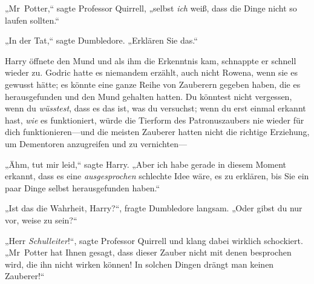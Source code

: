 „Mr~Potter,“ sagte Professor Quirrell, „selbst \emph{ich} weiß, dass die Dinge nicht so laufen sollten.“

„In der Tat,“ sagte Dumbledore. „Erklären Sie das.“

Harry öffnete den Mund und als ihm die Erkenntnis kam, schnappte er schnell wieder zu. Godric hatte es niemandem erzählt, auch nicht Rowena, wenn sie es gewusst hätte; es könnte eine ganze Reihe von Zauberern gegeben haben, die es herausgefunden und den Mund gehalten hatten. Du könntest nicht vergessen, wenn du \emph{wüsstest}, dass es das ist, was du versuchst; wenn du erst einmal erkannt hast, \emph{wie} es funktioniert, würde die Tierform des Patronuszaubers nie wieder für dich funktionieren—und die meisten Zauberer hatten nicht die richtige Erziehung, um Dementoren anzugreifen und zu vernichten—

„Ähm, tut mir leid,“ sagte Harry. „Aber ich habe gerade in diesem Moment erkannt, dass es eine \emph{ausgesprochen} schlechte Idee wäre, es zu erklären, bis Sie ein paar Dinge selbst herausgefunden haben.“

„Ist das die Wahrheit, Harry?“, fragte Dumbledore langsam. „Oder gibst du nur vor, weise zu sein?“

„Herr \emph{Schulleiter}!“, sagte Professor Quirrell und klang dabei wirklich schockiert. „Mr~Potter hat Ihnen gesagt, dass dieser Zauber nicht mit denen besprochen wird, die ihn nicht wirken können! In solchen Dingen drängt man keinen Zauberer!“

